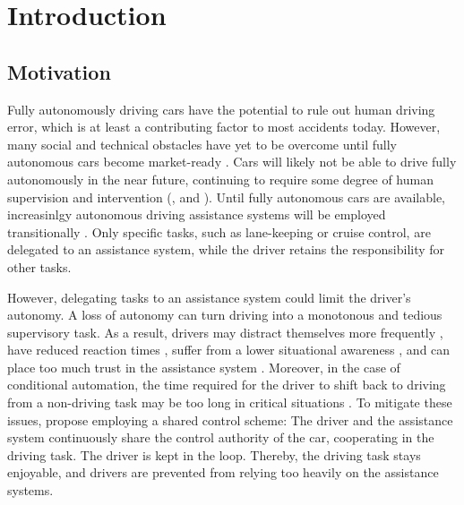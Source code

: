 \chapter{Introduction}
\label{sec:intro}

\section{Motivation}

Fully autonomously driving cars have the potential to rule out human driving error, which is at least a contributing factor to most accidents today. However, many social and technical obstacles have yet to be overcome until fully autonomous cars become market-ready \parencite{autonomous_driving_book}. Cars will likely not be able to drive fully autonomously in the near future, continuing to require some degree of human supervision and intervention (\cite{human-needed}, and \cite{human-needed-2}). Until fully autonomous cars are available, increasinlgy autonomous driving assistance systems will be employed transitionally \parencite{autonomy-future}. Only specific tasks, such as lane-keeping or cruise control, are delegated to an assistance system, while the driver retains the responsibility for other tasks.


However, delegating tasks to an assistance system could limit the driver's autonomy. A loss of autonomy can turn driving into a monotonous and tedious supervisory task. As a result, drivers may distract themselves more frequently \parencite{driver-distraction}, have reduced reaction times \parencite{reaction-time}, suffer from a lower situational awareness \parencite{situational-awareness}, and can place too much trust in the assistance system \parencite{over-trust}. Moreover, in the case of conditional automation, the time required for the driver to shift back to driving from a non-driving task may be too long in critical situations \parencite{takeover-time}. To mitigate these issues, \cite{shared-control-haptics} propose employing a shared control scheme: The driver and the assistance system continuously share the control authority of the car, cooperating in the driving task. The driver is kept in the loop. Thereby, the driving task stays enjoyable, and drivers are prevented from relying too heavily on the assistance systems.

